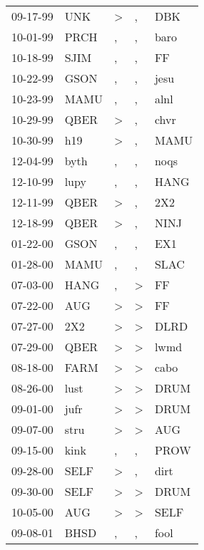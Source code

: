 \begin{supertabular}{lllll}
 09-17-99 &   UNK &  \textgreater &             , &   DBK \\
 10-01-99 &  PRCH &             , &             , &  baro \\
 10-18-99 &  SJIM &             , &             , &    FF \\
 10-22-99 &  GSON &             , &             , &  jesu \\
 10-23-99 &  MAMU &             , &             , &  alnl \\
 10-29-99 &  QBER &  \textgreater &             , &  chvr \\
 10-30-99 &   h19 &  \textgreater &             , &  MAMU \\
 12-04-99 &  byth &             , &             , &  noqs \\
 12-10-99 &  lupy &             , &             , &  HANG \\
 12-11-99 &  QBER &  \textgreater &             , &   2X2 \\
 12-18-99 &  QBER &  \textgreater &             , &  NINJ \\
 01-22-00 &  GSON &             , &             , &   EX1 \\
 01-28-00 &  MAMU &             , &             , &  SLAC \\
 07-03-00 &  HANG &             , &  \textgreater &    FF \\
 07-22-00 &   AUG &  \textgreater &  \textgreater &    FF \\
 07-27-00 &   2X2 &  \textgreater &  \textgreater &  DLRD \\
 07-29-00 &  QBER &  \textgreater &  \textgreater &  lwmd \\
 08-18-00 &  FARM &  \textgreater &  \textgreater &  cabo \\
 08-26-00 &  lust &  \textgreater &  \textgreater &  DRUM \\
 09-01-00 &  jufr &  \textgreater &  \textgreater &  DRUM \\
 09-07-00 &  stru &  \textgreater &  \textgreater &   AUG \\
 09-15-00 &  kink &             , &             , &  PROW \\
 09-28-00 &  SELF &  \textgreater &             , &  dirt \\
 09-30-00 &  SELF &  \textgreater &  \textgreater &  DRUM \\
 10-05-00 &   AUG &  \textgreater &  \textgreater &  SELF \\
 09-08-01 &  BHSD &             , &             , &  fool \\
\end{supertabular}
